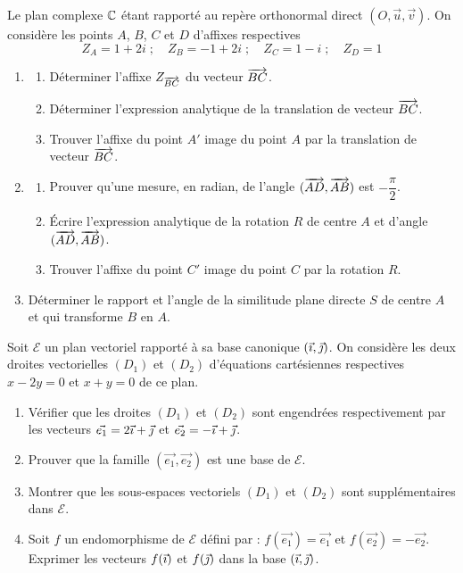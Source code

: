 \documentclass[11pt]{article}
\begin{document}


Le plan complexe $\mathbb{C}$ étant rapporté au repère orthonormal direct $(O,\vec{u},\vec{v})$. On considère les points $A$, $B$, $C$ et $D$ d'affixes respectives
\[ Z_A = 1 + 2i \;;\quad Z_B = -1 + 2i \;;\quad Z_C = 1 - i \;;\quad Z_D = 1 \]

\begin{enumerate}
  \item \begin{enumerate}[label=\alph*.]
    \item Déterminer l'affixe $Z_{\overrightarrow{BC}}$ du vecteur $\overrightarrow{BC}$.
    \item Déterminer l'expression analytique de la translation de vecteur $\overrightarrow{BC}$.
    \item Trouver l'affixe du point $A'$ image du point $A$ par la translation de vecteur $\overrightarrow{BC}$.
  \end{enumerate}
  \item \begin{enumerate}[label=\alph*.]
    \item Prouver qu'une mesure, en radian, de l'angle $(\overrightarrow{AD},\overrightarrow{AB})$ est $-\dfrac{\pi}{2}$.
    \item Écrire l'expression analytique de la rotation $R$ de centre $A$ et d'angle $(\overrightarrow{AD},\overrightarrow{AB})$.
    \item Trouver l'affixe du point $C'$ image du point $C$ par la rotation $R$.
  \end{enumerate}
  \item Déterminer le rapport et l'angle de la similitude plane directe $S$ de centre $A$ et qui transforme $B$ en $A$.
\end{enumerate}


Soit $\mathcal{E}$ un plan vectoriel rapporté à sa base canonique $(\vec{\imath},\vec{\jmath})$. On considère les deux droites vectorielles $(D_1)$ et $(D_2)$ d'équations cartésiennes respectives $x - 2y = 0$ et $x + y = 0$ de ce plan.

\begin{enumerate}
  \item Vérifier que les droites $(D_1)$ et $(D_2)$ sont engendrées respectivement par les vecteurs $\vec{e_1} = 2\vec{\imath} + \vec{\jmath}$ et $\vec{e_2} = -\vec{\imath} + \vec{\jmath}$.
  \item Prouver que la famille $(\vec{e_1},\vec{e_2})$ est une base de $\mathcal{E}$.
  \item Montrer que les sous-espaces vectoriels $(D_1)$ et $(D_2)$ sont supplémentaires dans $\mathcal{E}$.
  \item Soit $f$ un endomorphisme de $\mathcal{E}$ défini par : $f(\vec{e_1}) = \vec{e_1}$ et $f(\vec{e_2}) = -\vec{e_2}$. Exprimer les vecteurs $f(\vec{\imath})$ et $f(\vec{\jmath})$ dans la base $(\vec{\imath},\vec{\jmath})$.
\end{enumerate}
\end{document}
